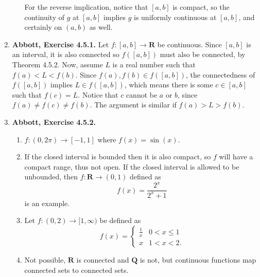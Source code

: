 \documentclass{article}
\newcommand{\Q}{\mathbf{Q}}
\newcommand{\R}{\mathbf{R}}
\newcommand{\exc}[2][Abbott]{\item \textbf{#1, Exercise #2.}}
\let\oldsin\sin
\renewcommand{\sin}[1]{\oldsin \left( #1 \right)}
\begin{document}
\begin{enumerate}
\begin{enumerate}
        For the reverse implication, notice that $[a, b]$ is compact, so the continuity of $g$ at $[a, b]$ implies $g$ is uniformly continuous at $[a, b]$, and certainly on $(a, b)$ as well.
    \end{enumerate}
    
    \exc{4.5.1}
    Let $f : [a, b] \to \R$ be continuous. Since $[a, b]$ is an interval, it is also connected so $f([a, b])$ must also be connected, by Theorem 4.5.2. Now, assume $L$ is a real number such that $f(a) < L < f(b)$.  Since $f(a), f(b) \in f([a, b])$, the connectedness of $f([a, b])$ implies $L \in f([a, b])$, which means there is some $c \in [a, b]$ such that $f(c) = L$. Notice that $c$ cannot be $a$ or $b$, since $f(a) \neq f(c) \neq f(b)$. The argument is similar if $f(a) > L > f(b)$.
    
    \exc{4.5.2}
    \begin{enumerate}
        \item $f:(0, 2 \pi) \to [-1, 1]$ where $f(x) = \sin{x}$.
        
        \item If the closed interval is bounded then it is also compact, so $f$ will have a compact range, thus not open. If the closed interval is allowed to be unbounded, then $f: \R \to (0, 1)$ defined as
        \begin{equation*}
            f(x) = \frac{2^x}{2^x+1}
        \end{equation*} is an example.
        
        \item Let $f: (0, 2) \to [1, \infty)$ be defined as 
        \begin{equation*}
            f(x) = 
            \begin{cases}
            \frac{1}{x} & 0 < x \leq 1 \\ 
            x & 1 < x < 2.
            \end{cases}
        \end{equation*}
        
        \item Not possible, $\R$ is connected and $\Q$ is not, but continuous functions map connected sets to connected sets.
    \end{enumerate}
    

\end{enumerate}
\end{document}
